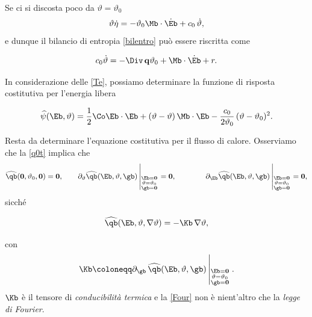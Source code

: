 Se ci si discosta poco da $\vartheta=\vartheta_0$
\begin{equation}
	\vartheta\dot{\eta}=-\vartheta_0\Mb \cdot \dot\Eb+c_0\,\dot\vartheta,
\end{equation}
e dunque il bilancio di entropia \eqref{bilentro} può essere riscritta come
\begin{definition}
\begin{equation}
	c_0 \dot\vartheta=- \Div \, \mathbf{q} \vartheta_0+ \Mb\cdot\dot{\Eb} + r.
\end{equation}
\end{definition}

In considerazione delle \eqref{Te}, possiamo determinare la funzione di risposta costitutiva per l'energia libera
\begin{definition}
	\begin{equation}
\widehat{\psi}(\Eb, \vartheta)=\frac{1}{2}\Co\Eb\cdot\Eb+(\vartheta-\vartheta)\,\Mb\cdot\Eb-\frac{c_0}{2\vartheta_0}\,(\vartheta-\vartheta_0)^2.
	\end{equation}
\end{definition}

Resta da determinare l'equazione costitutiva per il flusso di calore. Osserviamo che 
la \eqref{q0t} implica che
\begin{equation}
\widehat{\qb}(\mathbf{0},\vartheta_0, \mathbf{0})=\mathbf{0}, \qquad \partial_\vartheta\widehat{\qb}(\Eb, \vartheta, \gb)\left|_{\substack{\Eb=\mathbf{0} \\ \vartheta=\vartheta_0 \\ \gb=\mathbf{0}}}\right.
=\mathbf{0}, \qquad 
\qquad \partial_\Eb\widehat{\qb}(\Eb, \vartheta, \gb)\left|_{\substack{\Eb=\mathbf{0} \\ \vartheta=\vartheta_0 \\ \gb=\mathbf{0}}}\right.
=\mathbf{0},
\end{equation}
sicché
\begin{definition}
\begin{equation}\label{Four}
\widehat{\qb}(\Eb, \vartheta, \nabla\vartheta)=-\Kb\,\nabla\vartheta,
\end{equation}
\end{definition}
con
\begin{equation}
\Kb\coloneqq\partial_\gb\, \widehat{\qb}(\Eb, \vartheta, \gb)\left|_{\substack{\Eb=\mathbf{0} \\ \vartheta=\vartheta_0 \\ \gb=\mathbf{0}}}\right..
\end{equation}
$\Kb$ è il tensore di \textit{conducibilità termica} e la \eqref{Four} non è nient'altro che la \textit{legge di Fourier}.



